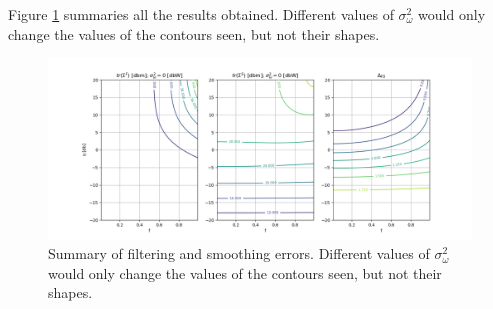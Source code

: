\documentclass[oneside,12pt]{article}
\begin{document}
%
Figure \ref{fig:conclusions} summaries all the results obtained. Different values of $\sigma_\omega^2$ would only change the values of the contours seen, but not their shapes. 
%
\begin{figure}
    \centering
        \includegraphics[width=1.0\textwidth]{./conclusions}
        \caption{\label{fig:conclusions}Summary of filtering and smoothing errors. Different values of $\sigma_\omega^2$ would only change the values of the contours seen, but not their shapes.}
\end{figure}
%
\end{document}
